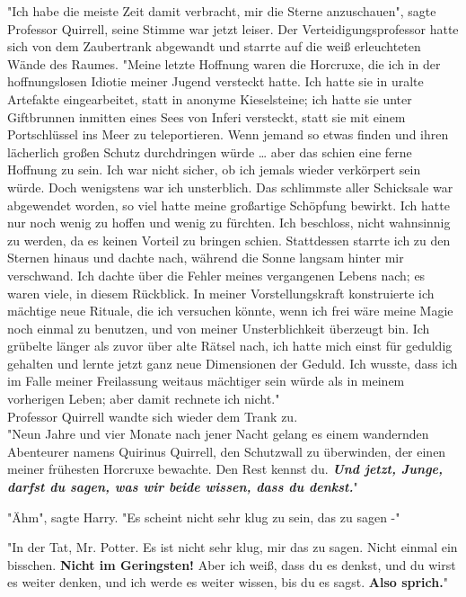 {"Ich habe die meiste Zeit damit verbracht, mir die Sterne anzuschauen", sagte Professor Quirrell, seine Stimme war jetzt leiser. Der Verteidigungsprofessor hatte sich von dem Zaubertrank abgewandt und starrte auf die weiß erleuchteten Wände des Raumes. "Meine letzte Hoffnung waren die Horcruxe, die ich in der hoffnungslosen Idiotie meiner Jugend versteckt hatte. Ich hatte sie in uralte Artefakte eingearbeitet, statt in anonyme Kieselsteine; ich hatte sie unter Giftbrunnen inmitten eines Sees von Inferi versteckt, statt sie mit einem Portschlüssel ins Meer zu teleportieren. Wenn jemand so etwas finden und ihren lächerlich großen Schutz durchdringen würde … aber das schien eine ferne Hoffnung zu sein. Ich war nicht sicher, ob ich jemals wieder verkörpert sein würde. Doch wenigstens war ich unsterblich. Das schlimmste aller Schicksale war abgewendet worden, so viel hatte meine großartige Schöpfung bewirkt. Ich hatte nur noch wenig zu hoffen und wenig zu fürchten. Ich beschloss, nicht wahnsinnig zu werden, da es keinen Vorteil zu bringen schien. Stattdessen starrte ich zu den Sternen hinaus und dachte nach, während die Sonne langsam hinter mir verschwand. Ich dachte über die Fehler meines vergangenen Lebens nach; es waren viele, in diesem Rückblick. In meiner Vorstellungskraft konstruierte ich mächtige neue Rituale, die ich versuchen könnte, wenn ich frei wäre meine Magie noch einmal zu benutzen, und von meiner Unsterblichkeit überzeugt bin. Ich grübelte länger als zuvor über alte Rätsel nach, ich hatte mich einst für geduldig gehalten und lernte jetzt ganz neue Dimensionen der Geduld. Ich wusste, dass ich im Falle meiner Freilassung weitaus mächtiger sein würde als in meinem vorherigen Leben; aber damit rechnete ich nicht."\\ Professor Quirrell wandte sich wieder dem Trank zu.\\ "Neun Jahre und vier Monate nach jener Nacht gelang es einem wandernden Abenteurer namens Quirinus Quirrell, den Schutzwall zu überwinden, der einen meiner frühesten Horcruxe bewachte. Den Rest kennst du. \textbf{\emph{Und jetzt, Junge, darfst du sagen, was wir beide wissen, dass du denkst.}}"

"Ähm", sagte Harry. "Es scheint nicht sehr klug zu sein, das zu sagen -"

"In der Tat, Mr. Potter. Es ist nicht sehr klug, mir das zu sagen. Nicht einmal ein bisschen. \textbf{Nicht im Geringsten!} Aber ich weiß, dass du es denkst, und du wirst es weiter denken, und ich werde es weiter wissen, bis du es sagst. \textbf{Also sprich.}"

}
